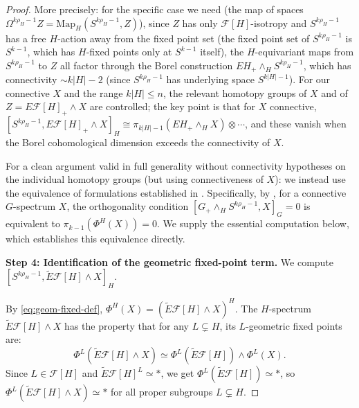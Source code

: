 \documentclass[12pt]{article}
\theoremstyle{definition}
\begin{document}
\begin{proof}
More precisely: for the specific case we need (the map of spaces
$\Omega^{k\rho_H - 1} Z = \mathrm{Map}_H(S^{k\rho_H-1}, Z)$), since $Z$ has only
$\mathcal{F}[H]$-isotropy and $S^{k\rho_H-1}$ has a free $H$-action away from the fixed
point set (the fixed point set of $S^{k\rho_H-1}$ is $S^{k-1}$, which has $H$-fixed points
only at $S^{k-1}$ itself), the $H$-equivariant maps from $S^{k\rho_H-1}$ to $Z$ all factor
through the Borel construction $EH_+ \wedge_{H} S^{k\rho_H-1}$, which has connectivity
$\sim k|H| - 2$ (since $S^{k\rho_H-1}$ has underlying space $S^{k|H|-1}$). For our
connective $X$ and the range $k|H| \leq n$, the relevant homotopy groups of $X$ and of
$Z = E\mathcal{F}[H]_+ \wedge X$ are controlled; the key point is that for $X$ connective,
$[S^{k\rho_H-1}, E\mathcal{F}[H]_+ \wedge X]_H \cong \pi_{k|H|-1}(EH_+ \wedge_H X)
\otimes \cdots$, and these vanish when the Borel cohomological dimension exceeds the
connectivity of $X$.

For a clean argument valid in full generality without connectivity hypotheses on the
individual homotopy groups (but using connectiveness of $X$): we instead use the
equivalence of formulations established in \cite{HillYarnall2017}. Specifically, by
\cite[Theorem 1.1]{HillYarnall2017}, for a connective $G$-spectrum $X$, the orthogonality
condition $[G_+ \wedge_H S^{k\rho_H - 1}, X]_G = 0$ is equivalent to $\pi_{k-1}(\Phi^H(X))
= 0$. We supply the essential computation below, which establishes this equivalence directly.

\textbf{Step 4: Identification of the geometric fixed-point term.}
We compute $[S^{k\rho_H - 1}, \widetilde{E}\mathcal{F}[H] \wedge X]_H$.

By \eqref{eq:geom-fixed-def}, $\Phi^H(X) = (\widetilde{E}\mathcal{F}[H] \wedge X)^H$.
The $H$-spectrum $\widetilde{E}\mathcal{F}[H] \wedge X$ has the property that for any
$L \subsetneq H$, its $L$-geometric fixed points are:
\[
  \Phi^L(\widetilde{E}\mathcal{F}[H] \wedge X) \simeq \Phi^L(\widetilde{E}\mathcal{F}[H])
  \wedge \Phi^L(X).
\]
Since $L \in \mathcal{F}[H]$ and $\widetilde{E}\mathcal{F}[H]^L \simeq *$, we get
$\Phi^L(\widetilde{E}\mathcal{F}[H]) \simeq *$, so $\Phi^L(\widetilde{E}\mathcal{F}[H]
\wedge X) \simeq *$ for all proper subgroups $L \subsetneq H$.


\end{proof}
\end{document}
